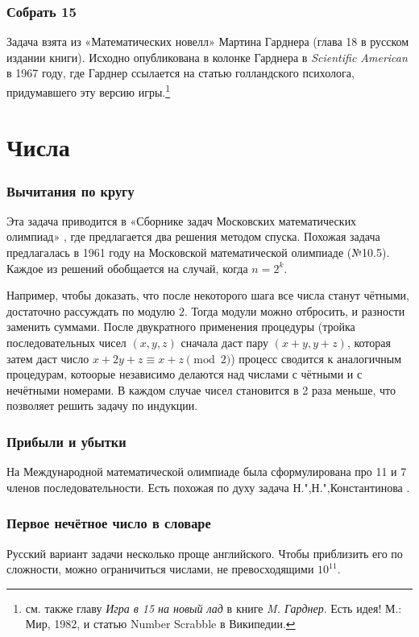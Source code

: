 \documentclass[twoside]{book}
\begin{document}
\subsubsection*{Собрать 15} %
Задача взята из «Математических новелл» Мартина Гарднера (глава 18 в русском издании книги).
Исходно опубликована в колонке Гарднера в \emph{Scientific American} в 1967 году, где Гарднер ссылается на статью голландского психолога, придумавшего эту версию игры.\footnote{см. также главу \emph{Игра в 15 на новый лад} в книге \emph{M. Гарднер}. Есть идея! М.: Мир, 1982, и статью Number Scrabble в Википедии.}

\section{Числа}

\subsubsection*{Вычитания по кругу}
Эта задача приводится в «Сборнике задач Московских математических олимпиад» \cite[№257, с. 73]{сборникМ}, где предлагается два решения методом спуска.
Похожая задача предлагалась в 1961 году на Московской математической олимпиаде (№10.5). 
Каждое из решений обобщается на случай, когда $n=2^k$.

Например, чтобы доказать, что после некоторого шага все числа станут чётными, достаточно рассуждать по модулю $2$.
Тогда модули можно отбросить, и разности  заменить суммами.
После двукратного применения процедуры (тройка последовательных чисел $(x,y,z)$ сначала даст пару $(x+y,y+z)$, которая затем даст число $x+2y+z\equiv x+z \pmod{2}$) процесс сводится к аналогичным  процедурам, котоорые независимо делаются над числами с чётными и с нечётными номерами. В каждом случае чисел становится в 2 раза меньше, что позволяет решить задачу по индукции.

\subsubsection{Прибыли и убытки}
На Международной математической олимпиаде была сформулирована про 11 и 7 членов последовательности.
Есть похожая по духу задача Н.",Н.",Константинова \cite[№~73652]{problems}.

\subsubsection{Первое нечётное число в словаре}
Русский вариант задачи несколько проще английского.
Чтобы приблизить его по сложности, можно ограничиться числами, не превосходящими $10^{11}$.
\end{document}
